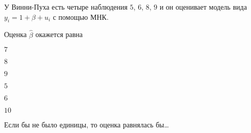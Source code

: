 
\begin{question}
У Винни-Пуха есть четыре наблюдения \(5\), \(6\), \(8\), \(9\) и он оценивает модель вида \(y_i = 1 + \beta + u_i\) с помощью МНК.

Оценка \(\hat \beta\) окажется равна
\begin{answerlist}
  \item \(7\)
  \item \(8\)
  \item \(9\)
  \item \(5\)
  \item \(6\)
  \item \(10\)
\end{answerlist}
\end{question}

\begin{solution}
Если бы не было единицы, то оценка равнялась бы\ldots{}
\end{solution}

